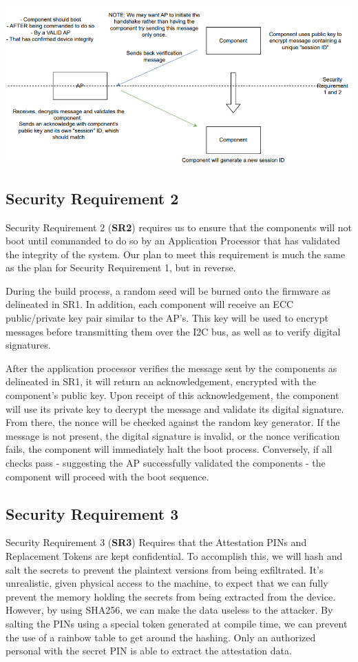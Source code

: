 \documentclass{prace}
\begin{document}
\includegraphics[scale=0.8]{./diagramSR12.png}

\subsection{Security Requirement 2}
Security Requirement 2 (\textbf{SR2}) requires us to ensure that the components will not boot until commanded
to do so by an Application Processor that has validated the integrity of the system. Our plan to
meet this requirement is much the same as the plan for Security Requirement 1, but in reverse.


During the build process, a random seed will be burned onto the firmware as delineated in 
SR1. In addition, each component will receive an ECC public/private key pair similar to the AP's.
This key will be used to encrypt messages before transmitting them over the I2C bus, as well
as to verify digital signatures.

After the application processor verifies the message sent by the components as delineated
in SR1, it will return an acknowledgement, encrypted with the component's public key. Upon
receipt of this acknowledgement, the component will use its private key to decrypt the 
message and validate its digital signature. From there, the nonce will be checked against
the random key generator. If the message is not present, the digital signature is invalid,
or the nonce verification fails, the component will immediately halt the boot process.
Conversely, if all checks pass - suggesting the AP successfully validated the components -
the component will proceed with the boot sequence.

\subsection{Security Requirement 3}
Security Requirement 3 (\textbf{SR3}) Requires that the Attestation PINs and Replacement Tokens are kept confidential.
To accomplish this, we will hash and salt the secrets to prevent the plaintext versions from being exfiltrated.
It's unrealistic, given physical access to the machine, to expect that we can fully prevent the memory holding
the secrets from being extracted from the device. However, by using SHA256, we can make the data useless to the
attacker. By salting the PINs using a special token generated at compile time, we can prevent the use of a rainbow
table to get around the hashing. Only an authorized personal with the secret PIN is able to extract the attestation data.
\end{document}
